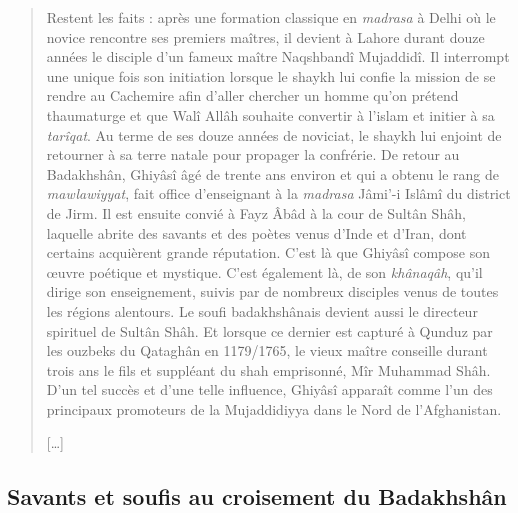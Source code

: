 \begin{quote}
Restent les faits : après une formation classique en \emph{madrasa} à
Delhi où le novice rencontre ses premiers maîtres, il devient à Lahore
durant douze années le disciple d'un fameux maître Naqshbandî Mujaddidî.
Il interrompt une unique fois son initiation lorsque le shaykh lui
confie la mission de se rendre au Cachemire afin d'aller chercher un
homme qu'on prétend thaumaturge et que Walî Allâh souhaite convertir à
l'islam et initier à sa \emph{tarîqat}. Au terme de ses douze années de
noviciat, le shaykh lui enjoint de retourner à sa terre natale pour
propager la confrérie. De retour au Badakhshân, Ghiyâsî âgé de trente
ans environ et qui a obtenu le rang de \emph{mawlawiyyat}, fait office
d'enseignant à la \emph{madrasa} Jâmi'-i Islâmî du district de Jirm. Il
est ensuite convié à Fayz Âbâd à la cour de Sultân Shâh, laquelle abrite
des savants et des poètes venus d'Inde et d'Iran, dont certains
acquièrent grande réputation. C'est là que Ghiyâsî compose son œuvre
poétique et mystique. C'est également là, de son \emph{khânaqâh}, qu'il
dirige son enseignement, suivis par de nombreux disciples venus de
toutes les régions alentours. Le soufi badakhshânais devient aussi le
directeur spirituel de Sultân Shâh. Et lorsque ce dernier est capturé à
Qunduz par les ouzbeks du Qataghân en 1179/1765, le vieux maître
conseille durant trois ans le fils et suppléant du shah emprisonné, Mîr
Muhammad Shâh. D'un tel succès et d'une telle influence, Ghiyâsî
apparaît comme l'un des principaux promoteurs de la Mujaddidiyya dans le
Nord de l'Afghanistan.

{[}\ldots{]}
\end{quote}

\hypertarget{savants-et-soufis-au-croisement-du-badakhshuxe2n}{%
\subsection{Savants et soufis au croisement du
Badakhshân}\label{savants-et-soufis-au-croisement-du-badakhshuxe2n}}

